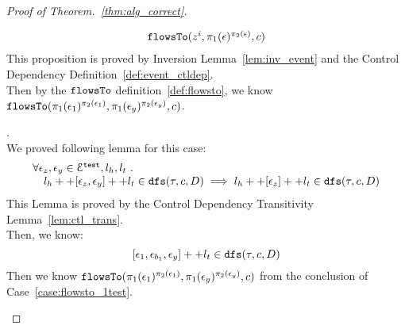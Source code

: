 \begin{proof}[Proof of Theorem.~\ref{thm:alg_correct}]
\begin{case}
\begin{subcase}
\[\begin{array}{l}
  \mathtt{flowsTo}(z^i, \pi_1(\mathtt{\epsilon})^{\pi_2(\mathtt{\epsilon})}, c)
  \end{array}
  \]
This proposition is proved by Inversion Lemma~\ref{lem:inv_event} and the Control Dependency Definition~\ref{def:event_ctldep}.
%
\\
Then by the $\mathtt{flowsTo}$ definition~\ref{def:flowsto}, we know $\mathtt{flowsTo}(\pi_1(\mathtt{\epsilon}_1)^{\pi_2(\mathtt{\epsilon}_1)}, \pi_1(\mathtt{\epsilon}_y)^{\pi_2(\mathtt{\epsilon}_y)}, c) $.
\end{subcase}
%
%
\begin{subcase}[ $l_e = {[\event_1, \event_{b_1}, \cdots, \event_{b_n}, \event_y]} ++ l_t$ ].
%
\\
We proved following lemma for this case:
\begin{equation}
  \begin{array}{l}
    \forall \mathtt{\epsilon}_z, \mathtt{\epsilon}_y \in \mathcal{E}^{\mathtt{{test}}}, l_h, l_t ~.~
     \\ \quad 
     l_h ++ [\mathtt{\epsilon}_z, \mathtt{\epsilon}_y] ++ l_t \in \mathtt{dfs}(\mathtt{\tau}, c, D)
    \implies l_h ++ [\mathtt{\epsilon}_z] ++ l_t \in \mathtt{dfs}(\mathtt{\tau}, c, D)
  \end{array}
  \end{equation}
%
This Lemma is proved by the Control Dependency Transitivity Lemma~\ref{lem:ctl_trans}.
\\
Then, we know:
\[
  {[\mathtt{\epsilon}_1, \mathtt{\epsilon}_{b_1}, \mathtt{\epsilon}_y]} ++ l_t \in \mathtt{dfs}(\mathtt{\tau}, c, D)
\]
Then we know $\mathtt{flowsTo}(\pi_1(\mathtt{\epsilon}_1)^{\pi_2(\mathtt{\epsilon}_1)}, \pi_1(\mathtt{\epsilon}_y)^{\pi_2(\mathtt{\epsilon}_y)}, c) $ from the conclusion of Case~\ref{case:flowsto_1test}.
\end{subcase}
%
\end{case}
%
\end{proof}